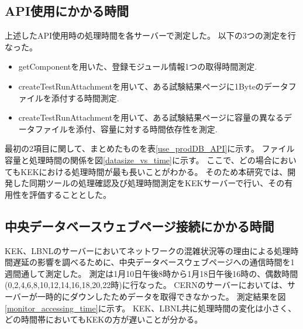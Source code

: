 \subsection{API使用にかかる時間}
上述したAPI使用時の処理時間を各サーバーで測定した。
以下の3つの測定を行なった。
\begin{itemize}
  \item getComponentを用いた、登録モジュール情報1つの取得時間測定.
  \item createTestRunAttachmentを用いて、ある試験結果ページに1Byteのデータファイルを添付する時間測定.
  \item createTestRunAttachmentを用いて、ある試験結果ページに容量の異なるデータファイルを添付、容量に対する時間依存性を測定.
\end{itemize}

最初の2項目に関して、まとめたものを表\ref{use_prodDB_API}に示す。
ファイル容量と処理時間の関係を図\ref{datasize_vs_time}に示す。
ここで、どの場合においてもKEKにおける処理時間が最も長いことがわかる。
そのため本研究では、開発した同期ツールの処理確認及び処理時間測定をKEKサーバーで行い、その有用性を評価することとした。

\subsection{中央データベースウェブページ接続にかかる時間}
KEK、LBNLのサーバーにおいてネットワークの混雑状況等の理由による処理時間遅延の影響を調べるために、中央データベースウェブページへの通信時間を1週間通して測定した。
測定は1月10日午後8時から1月18日午後16時の、偶数時間(0,2,4,6,8,10,12,14,16,18,20,22時)に行なった。
CERNのサーバーにおいては、サーバーが一時的にダウンしたためデータを取得できなかった。
測定結果を図\ref{monitor_accessing_time}に示す。
KEK、LBNL共に処理時間の変化は小さく、どの時間帯においてもKEKの方が遅いことが分かる。

